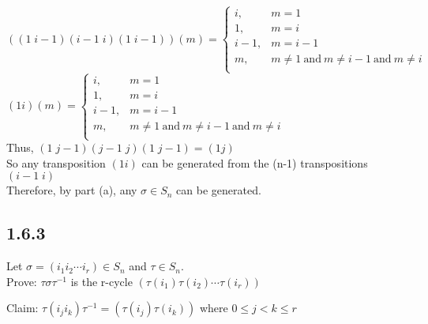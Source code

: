 \documentclass[letterpaper,12pt,fleqn]{article}
\renewcommand{\o}{\sigma}
\renewcommand{\t}{\tau}
\begin{document}
\begin{enumerate}[label={\alph*)}]
  $((1\;i-1)(i-1\;i)(1\;i-1))(m)=\begin{cases}
  i, & m=1 \\
  1, & m=i \\
  i-1, & m=i-1 \\
  m, & m\ne 1\ \mbox{and}\ m\ne i-1\ \mbox{and}\ m\ne i \\
  \end{cases}$ \\

  $(1i)(m)=\begin{cases}
  i, & m=1 \\
  1, & m=i \\
  i-1, & m=i-1 \\
  m, & m\ne 1\ \mbox{and}\ m\ne i-1\ \mbox{and}\ m\ne i \\
  \end{cases}$ \\

  Thus, $(1\;j-1)(j-1\;j)(1\;j-1)=(1j)$ \\
  So any transposition $(1i)$ can be generated from the (n-1) transpositions
  $(i-1\;i)$ \\
  Therefore, by part (a), any $\o\in S_n$ can be generated.
\end{enumerate}

\subsection*{1.6.3}
Let $\o=(i_1i_2\cdots i_r)\in S_n$ and $\t\in S_n$. \\
Prove: $\t\o\t^{-1}$ is the r-cycle $(\t(i_1)\t(i_2)\cdots\t(i_r))$

Claim: $\t(i_ji_k)\t^{-1}=(\t(i_j)\t(i_k))$ where $0\le j<k\le r$
\end{document}
